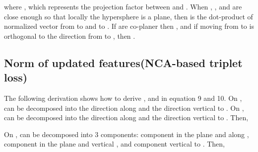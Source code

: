 \documentclass[runningheads]{llncs}
\begin{document}
where , which represents the projection factor between  and . When , , and  are close enough so that locally the hypersphere is a plane, then  is the dot-product of normalized vector from  to  and  to . If  are co-planer then , and if moving from  to  is orthogonal to the direction from  to , then .

\subsection{Norm of updated features(NCA-based triplet loss)}
The following derivation shows how to derive ,   and  in equation 9 and 10. On ,  can be decomposed into the direction along  and the direction vertical to . On ,  can be decomposed into the direction along  and the direction vertical to . Then,

On ,  can be decomposed into 3 components: component in the plane and along , component in the plane and vertical , and component vertical to . Then, 
\end{document}
